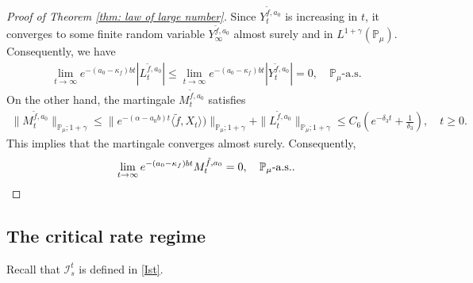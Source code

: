 \documentclass[12pt,a4paper]{amsart}
\theoremstyle{plain}
\theoremstyle{definition}
\numberwithin{equation}{section}
\begin{document}
\begin{proof}[Proof of Theorem \ref{thm: law of large number}]
    Since $Y_t^{\tilde{f},a_0}$ is increasing in $t$, it converges to some finite random variable $Y_{\infty}^{\tilde{f},a_0}$ almost surely and in $L^{1+\gamma}(\mathbb{P}_{\mu})$.
Consequently,  we have
\begin{align}
    \lim_{t\rightarrow \infty}e^{-(a_0 - \kappa_f)bt}|L_t^{\tilde{f},a_0}|
    \leq  \lim_{t\rightarrow \infty}e^{-(a_0 - \kappa_f)bt}|Y_t^{\tilde{f},a_0}|=0, \quad
     \mathbb P_\mu\text{-a.s.}
\end{align}
	On the other hand, the martingale $M_t^{\tilde{f},a_0}$ satisfies
\begin{align}
    \|M_t^{\tilde{f},a_0}\|_{\mathbb{P}_{\mu};1+\gamma}
    \leq  \|e^{-(\alpha-a_0 b)t}\langle \tilde{f},X_t\rangle)\|_{\mathbb{P}_{\mu};1+\gamma}+\|L_t^{\tilde{f},a_0}\|_{\mathbb{P}_{\mu};1+\gamma}
    \leq C_6(e^{-\delta_3 t}+\frac{1}{\delta_3}),
    \quad t\geq 0.
\end{align}
	This implies that the martingale converges almost surely.
	Consequently,
\[
	\lim_{t\rightarrow\infty} e^{-(a_0-\kappa_f)bt}M_t^{\tilde{f},a_0}
	=0,
	\quad \mathbb P_\mu\text{-a.s.}.
    \qedhere
\]
\end{proof}

\subsection{The critical rate regime}
\label{sec:critical}

    Recall that $\mathcal I_s^t$ is defined in \eqref{Ist}.
    
   
    
\end{document}
